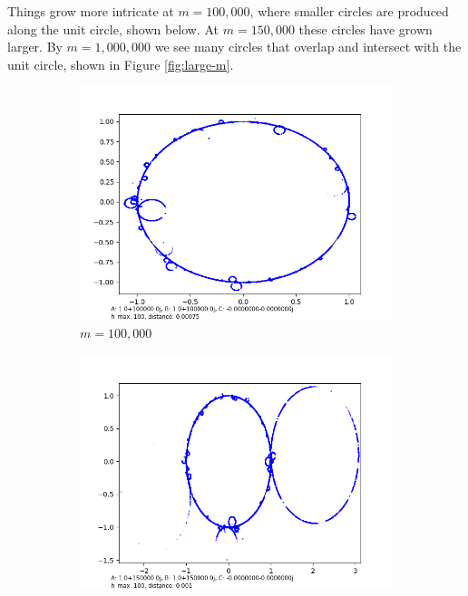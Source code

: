 \documentclass[12pt,a4paper,reqno,parskip=full]{amsart}
\numberwithin{equation}{section}
\theoremstyle{plain}
\theoremstyle{definition}
\begin{document}
Things grow more intricate at $m=100,000$, where smaller circles are produced along the unit circle, shown below. At $m=150,000$ these circles have grown larger. By $m=1,000,000$ we see many circles that overlap and intersect with the unit circle, shown in Figure \ref{fig:large-m}.

\begin{figure}
     \centering
     
     \begin{subfigure}[b]{0.3\textwidth}
         \centering
         \includegraphics[width=\textwidth]{images/m/a100,000,b100,000,h100,d.00075.png}
         \caption{$m=100,000$}
         \label{fig:m100,000}
     \end{subfigure}
     \hfill
     \begin{subfigure}[b]{0.3\textwidth}
         \centering
         \includegraphics[width=\textwidth]{images/m/a150,000,b150,000,h100,d.0010.png}

\end{subfigure}
\end{figure}
\end{document}
